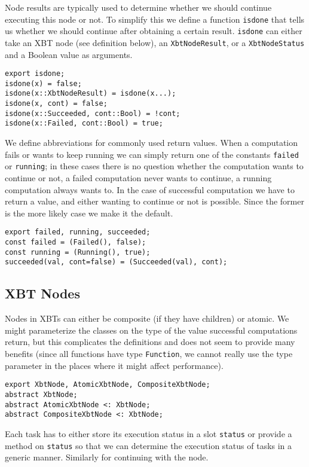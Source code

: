 \documentclass[a4wide]{article}
\begin{document}
Node results are typically used to determine whether we should
continue executing this node or not.  To simplify this we define a
function \verb~isdone~ that tells us whether we should continue after
obtaining a certain result.  \verb~isdone~ can either take an XBT node
(see definition below), an \verb~XbtNodeResult~, or a \verb~XbtNodeStatus~
and a Boolean value as arguments.

\begin{verbatim}
export isdone;
isdone(x) = false;
isdone(x::XbtNodeResult) = isdone(x...);
isdone(x, cont) = false;
isdone(x::Succeeded, cont::Bool) = !cont;
isdone(x::Failed, cont::Bool) = true;
\end{verbatim}

We define abbreviations for commonly used return values. When a
computation fails or wants to keep running we can simply return one
of the constants \verb~failed~ or \verb~running~; in these cases there is no
question whether the computation wants to continue or not, a failed
computation never wants to continue, a running computation always
wants to.  In the case of successful computation we have to return
a value, and either wanting to continue or not is possible.  Since
the former is the more likely case we make it the default.
\begin{verbatim}
export failed, running, succeeded;
const failed = (Failed(), false);
const running = (Running(), true);
succeeded(val, cont=false) = (Succeeded(val), cont);
\end{verbatim}

\subsection{XBT Nodes}
\label{sec-3-3}

Nodes in XBTs can either be composite (if they have children) or
atomic.  We might parameterize the classes on the type of the value
successful computations return, but this complicates the
definitions and does not seem to provide many benefits (since all
functions have type \verb~Function~, we cannot really use the type
parameter in the places where it might affect performance).

\begin{verbatim}
export XbtNode, AtomicXbtNode, CompositeXbtNode;
abstract XbtNode;
abstract AtomicXbtNode <: XbtNode;
abstract CompositeXbtNode <: XbtNode;
\end{verbatim}

Each task has to either store its execution status in a slot
\verb~status~ or provide a method on \verb~status~ so that we can determine
the execution status of tasks in a generic manner.  Similarly for
continuing with the node.
\end{document}
